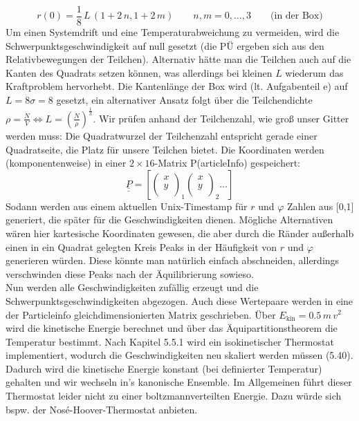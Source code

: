 \begin{equation*}
r(0) = \frac{1}{8}\,L\, \left( 1 + 2\,n,1+2\,m\right) \qquad n,m = 0,\ldots,3 \qquad \text{(in der Box)}
\end{equation*}
Um einen Systemdrift und eine Temperaturabweichung zu vermeiden, wird die Schwerpunktsgeschwindigkeit auf null gesetzt (die PÜ ergeben sich aus den Relativbewegungen der Teilchen). Alternativ hätte man die Teilchen auch auf die Kanten des Quadrats setzen können, was allerdings bei kleinen $L$ wiederum das Kraftproblem hervorhebt.
Die Kantenlänge der Box wird (lt. Aufgabenteil e) auf $L = 8\sigma= 8$ gesetzt, ein alternativer Ansatz folgt über die Teilchendichte $\rho = \frac{N}{V} \Leftrightarrow L = \left(\frac{N}{\rho}\right)^{\frac{1}{3}}$. Wir prüfen anhand der Teilchenzahl, wie groß unser Gitter werden muss: Die Quadratwurzel der Teilchenzahl entspricht gerade einer Quadratseite, die Platz für unsere Teilchen bietet. Die Koordinaten werden (komponentenweise) in einer $2\times16$-Matrix P(articleInfo) gespeichert:
\begin{equation*}
	\underline{\underline{P}} = 
	\left[
	\begin{pmatrix}
		x\\
		y\\		
	\end{pmatrix}_1
	\begin{pmatrix}
		x\\
		y\\		
	\end{pmatrix}_2
	\ldots
	\right]
\end{equation*}
Sodann werden aus einem aktuellen Unix-Timestamp für $r$ und $\varphi$ Zahlen aus [0,1] generiert, die später für die Geschwindigkeiten dienen. Mögliche Alternativen wären hier kartesische Koordinaten gewesen, die aber durch die Ränder außerhalb einen in ein Quadrat gelegten Kreis Peaks in der Häufigkeit von $r$ und $\varphi$ generieren würden. Diese könnte man natürlich einfach abschneiden, allerdings verschwinden diese Peaks nach der Äquilibrierung sowieso.\\

Nun werden alle Geschwindigkeiten zufällig erzeugt und die Schwerpunktsgeschwindigkeiten abgezogen. Auch diese Wertepaare werden in eine der Particleinfo gleichdimensionierten Matrix geschrieben. Über $E_{\text{kin}} = 0.5\,m\,v^2$ wird die kinetische Energie berechnet und über das Äquipartitionstheorem die Temperatur bestimmt. Nach Kapitel 5.5.1 wird ein isokinetischer Thermostat implementiert, wodurch die Geschwindigkeiten neu skaliert werden müssen (5.40). Dadurch wird die kinetische Energie konstant (bei definierter Temperatur) gehalten und wir wechseln in's kanonische Ensemble. Im Allgemeinen führt dieser Thermostat leider nicht zu einer boltzmannverteilten Energie. Dazu würde sich bspw. der Nos\'{e}-Hoover-Thermostat anbieten.

